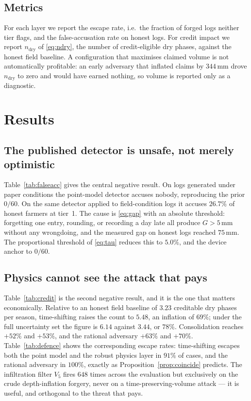 \documentclass[journal]{IEEEtran}
\begin{document}
\subsection{Metrics}

For each layer we report the escape rate, i.e.\ the fraction of forged logs
neither tier flags, and the false-accusation rate on honest logs. For credit
impact we report $n_{\mathrm{dry}}$ of \eqref{eq:ndry}, the number of
credit-eligible dry phases, against the honest field baseline. A configuration
that maximises claimed volume is not automatically profitable: an early adversary
that inflated claims by $344$\,mm drove $n_{\mathrm{dry}}$ to zero and would have
earned nothing, so volume is reported only as a diagnostic.

\section{Results}
\label{sec:results}

\subsection{The published detector is unsafe, not merely optimistic}

Table~\ref{tab:falseacc} gives the central negative result. On logs generated
under paper conditions the point-model detector accuses nobody, reproducing the
prior $0/60$. On the same detector applied to field-condition logs it accuses
$26.7\%$ of honest farmers at tier~1. The cause is \eqref{eq:gap} with an
absolute threshold: forgetting one entry, rounding, or recording a day late all
produce $G>5$\,mm without any wrongdoing, and the measured gap on honest logs
reached $75$\,mm. The proportional threshold of \eqref{eq:tau} reduces this to
$5.0\%$, and the device anchor to $0/60$.

\subsection{Physics cannot see the attack that pays}

Table~\ref{tab:credit} is the second negative result, and it is the one that
matters economically. Relative to an honest field baseline of $3.23$ creditable
dry phases per season, time-shifting raises the count to $5.48$, an inflation of
$69\%$; under the full uncertainty set the figure is $6.14$ against $3.44$, or
$78\%$. Consolidation reaches $+52\%$ and $+53\%$, and the rational adversary
$+63\%$ and $+70\%$. Table~\ref{tab:defence} shows the corresponding escape
rates: time-shifting escapes both the point model and the robust physics layer
in $91\%$ of cases, and the rational adversary in $100\%$, exactly as
Proposition~\ref{prop:coincide} predicts. The infiltration filter $V_5$ fires
$648$ times across the evaluation but exclusively on the crude
depth-inflation forgery, never on a time-preserving-volume attack --- it is
useful, and orthogonal to the threat that pays.
\end{document}
